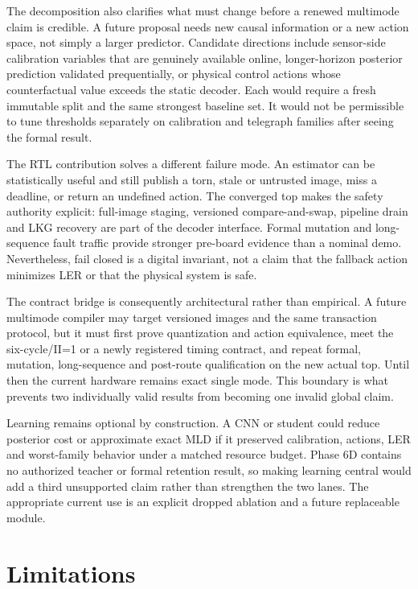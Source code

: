 \documentclass[11pt]{article}
\begin{document}
The decomposition also clarifies what must change before a renewed multimode
claim is credible.  A future proposal needs new causal information or a new
action space, not simply a larger predictor.  Candidate directions include
sensor-side calibration variables that are genuinely available online,
longer-horizon posterior prediction validated prequentially, or physical
control actions whose counterfactual value exceeds the static decoder.  Each
would require a fresh immutable split and the same strongest baseline set.  It
would not be permissible to tune thresholds separately on calibration and
telegraph families after seeing the formal result.

The RTL contribution solves a different failure mode.  An estimator can be
statistically useful and still publish a torn, stale or untrusted image, miss a
deadline, or return an undefined action.  The converged top makes the safety
authority explicit: full-image staging, versioned compare-and-swap, pipeline
drain and LKG recovery are part of the decoder interface.  Formal mutation and
long-sequence fault traffic provide stronger pre-board evidence than a
nominal demo.  Nevertheless, fail closed is a digital invariant, not a claim
that the fallback action minimizes LER or that the physical system is safe.

The contract bridge is consequently architectural rather than empirical.  A
future multimode compiler may target versioned images and the same transaction
protocol, but it must first prove quantization and action equivalence, meet the
six-cycle/II=1 or a newly registered timing contract, and repeat formal,
mutation, long-sequence and post-route qualification on the new actual top.
Until then the current hardware remains exact single mode.  This boundary is
what prevents two individually valid results from becoming one invalid global
claim.

Learning remains optional by construction.  A CNN or student could reduce
posterior cost or approximate exact MLD if it preserved calibration, actions,
LER and worst-family behavior under a matched resource budget.  Phase 6D
contains no authorized teacher or formal retention result, so making learning
central would add a third unsupported claim rather than strengthen the two
lanes.  The appropriate current use is an explicit dropped ablation and a
future replaceable module.

\section{Limitations}
\end{document}
